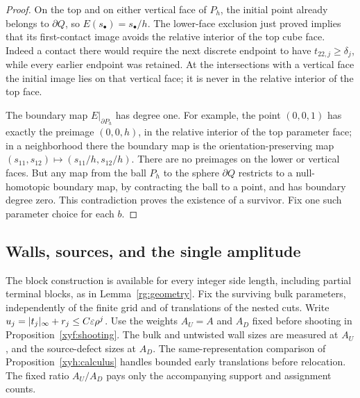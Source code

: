 \begin{proof}
On the top and on either vertical face of \(P_h\), the initial
point already belongs to \(\partial Q\), so
\(E(s_\bullet)=s_\bullet/h\).  The lower-face exclusion just proved
implies that its first-contact image avoids the relative interior
of the top cube face.  Indeed a contact there would require the next
discrete endpoint to have \(t_{22,j}\ge\delta_j\), while every
earlier endpoint was retained.  At the intersections with a vertical
face the initial image lies on that vertical face; it is never in
the relative interior of the top face.

The boundary map \(E|_{\partial P_h}\) has degree one.  For example,
the point \((0,0,1)\) has exactly the preimage \((0,0,h)\), in the
relative interior of the top parameter face; in a neighborhood there
the boundary map is the orientation-preserving map
\((s_{11},s_{12})\mapsto(s_{11}/h,s_{12}/h)\).
There are no preimages on the lower or vertical faces.  But any map
from the ball \(P_h\) to the sphere \(\partial Q\) restricts to a
null-homotopic boundary map, by contracting the ball to a point, and
has boundary degree zero.  This contradiction proves the existence
of a survivor.  Fix one such parameter choice for each \(b\).
\end{proof}

\subsection{Walls, sources, and the single amplitude}

The block construction is available for every integer side length,
including partial terminal blocks, as in Lemma~\ref{rg:geometry}.
Fix the surviving bulk parameters, independently of the finite grid
and of translations of the nested cuts.  Write
\(u_j=|t_j|_\infty+r_j\le C\varepsilon\rho^j\).
Use the weights \(A_U=A\) and \(A_D\) fixed before shooting in
Proposition~\ref{xyf:shooting}.  The bulk and untwisted wall sizes
are measured at \(A_U\), and the source-defect sizes at \(A_D\).
The same-representation comparison of Proposition~\ref{xyh:calculus}
handles bounded early translations before relocation. The fixed ratio
\(A_U/A_D\) pays only the accompanying support and assignment counts.

